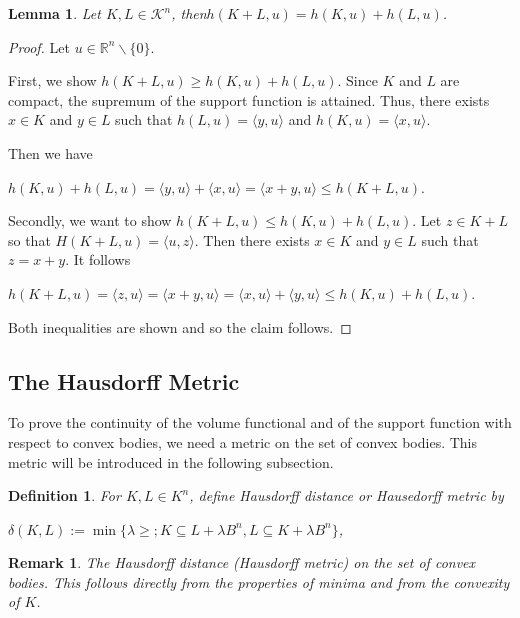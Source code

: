 \documentclass[a4paper]{book}
\newtheorem{lemma}[theorem]{Lemma}%
\newtheorem{remark}[theorem]{Remark}%
\newtheorem{definition}[theorem]{Definition}%
\numberwithin{theorem}{section}%
\begin{document}
\begin{lemma}
    Let $K,L\in\mathscr{K}^{n}$, then$h(K+L,u)=h(K,u)+h(L,u)$.
\end{lemma}
\begin{proof}
    Let $u\in\mathbb{R}^{n}\backslash\{0\}$.

    First, we show $h(K+L,u)\geq h(K,u)+h(L,u)$. Since $K$ and $L$ are compact, the supremum of the support function is attained. Thus, there exists $x\in K$ and $y\in L$ such that $h(L,u)=\langle y,u\rangle$ and $h(K,u)=\langle x,u\rangle$.

    Then we have
    \begin{center}
        $h(K,u)+h(L,u)=\langle y,u\rangle+\langle x,u\rangle=\langle x+y,u\rangle\leq h(K+L,u)$.
    \end{center}

    Secondly, we want to show $h(K+L,u)\leq h(K,u)+h(L,u)$. Let $z\in K+L$ so that $H(K+L,u)=\langle u,z\rangle$. Then there exists $x\in K$ and $y\in L$ such that $z=x+y$. It follows
    \begin{center}
        $h(K+L,u)=\langle z,u\rangle=\langle x+y,u\rangle=\langle x,u\rangle+\langle y,u\rangle\leq h(K,u)+h(L,u)$.
    \end{center}
    Both inequalities are shown and so the claim follows.
\end{proof}

\subsection{The Hausdorff Metric}
To prove the continuity of the volume functional and of the support function with respect to convex bodies, we need a metric on the set of convex bodies. This metric will be introduced in the following subsection.~\citep{gehring2019isoperimetric}

\begin{definition}
    For $K,L\in K^{n}$, define Hausdorff distance or Hausedorff metric by
    \begin{center}
        $\delta(K,L):=\min\{\lambda\geq;K\subseteq L+\lambda B^{n},L\subseteq K+\lambda B^{n}\}$,
    \end{center}
\end{definition}

\begin{remark}
    The Hausdorff distance (Hausdorff metric) on the set of convex bodies. This follows directly from the properties of minima and from the convexity of $K$.
\end{remark}
\end{document}
